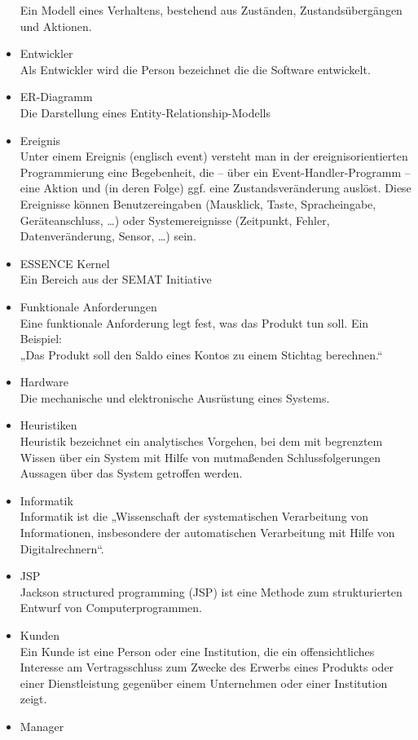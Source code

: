 \begin{itemize}
Ein Modell eines Verhaltens, bestehend aus Zuständen, Zustandsübergängen und Aktionen.
\item 	Entwickler\\
Als Entwickler wird die Person bezeichnet die die Software entwickelt.
\item 	ER-Diagramm\\
Die Darstellung eines Entity-Relationship-Modells
\item 	Ereignis\\Unter einem Ereignis (englisch event) versteht man in der ereignisorientierten Programmierung eine Begebenheit, die – über ein Event-Handler-Programm – eine Aktion und (in deren Folge) ggf. eine Zustandsveränderung auslöst. Diese Ereignisse können Benutzereingaben (Mausklick, Taste, Spracheingabe, Geräteanschluss, …) oder Systemereignisse (Zeitpunkt, Fehler, Datenveränderung, Sensor, …) sein.
\item 	ESSENCE Kernel\\
Ein Bereich aus der SEMAT Initiative
\item 	Funktionale Anforderungen\\
Eine funktionale Anforderung legt fest, was das Produkt tun soll. Ein Beispiel:
\\
„Das Produkt soll den Saldo eines Kontos zu einem Stichtag berechnen.“
\item 	Hardware\\
Die mechanische und elektronische Ausrüstung eines Systems.
\item Heuristiken \\ Heuristik bezeichnet ein analytisches Vorgehen, bei dem mit begrenztem Wissen über ein System mit Hilfe von mutmaßenden Schlussfolgerungen Aussagen über das System getroffen werden.
\item 	Informatik\\Informatik ist die „Wissenschaft der systematischen Verarbeitung von Informationen, insbesondere der automatischen Verarbeitung mit Hilfe von Digitalrechnern“.
\item 	JSP\\Jackson structured programming (JSP) ist eine Methode zum strukturierten Entwurf von Computerprogrammen.
\item 	Kunden\\Ein Kunde ist eine Person oder eine Institution, die ein offensichtliches Interesse am Vertragsschluss zum Zwecke des Erwerbs eines Produkts oder einer Dienstleistung gegenüber einem Unternehmen oder einer Institution zeigt.
\item 	Manager\\

\end{itemize}
